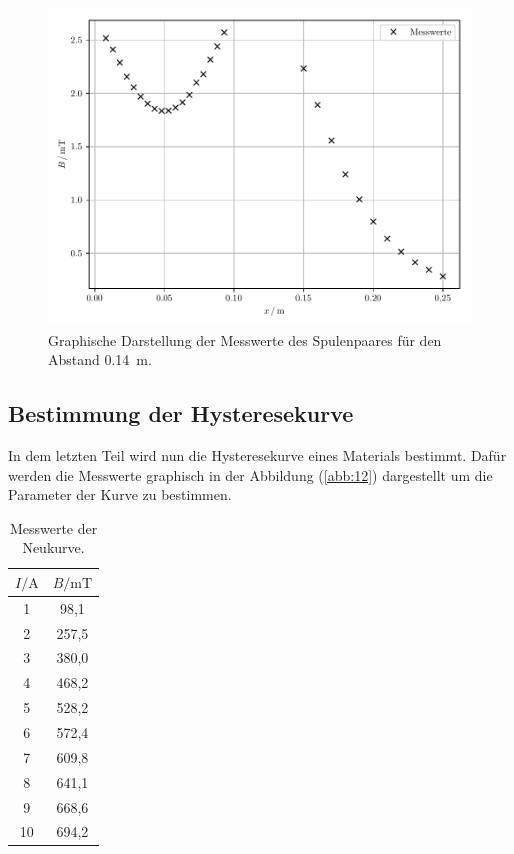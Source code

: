 \begin{figure}[H]
  \centering
  \includegraphics{plot5.pdf}
  \caption{Graphische Darstellung der Messwerte des Spulenpaares für den Abstand \SI{0.14}{\meter}.}
  \label{abb:11}
\end{figure}

\subsection{Bestimmung der Hysteresekurve}

In dem letzten Teil wird nun die Hysteresekurve eines Materials bestimmt. Dafür werden
die Messwerte graphisch in der Abbildung (\ref{abb:12}) dargestellt um die Parameter
der Kurve zu bestimmen.

\begin{table}
  \centering
  \caption{Messwerte der Neukurve.}
  \label{tab:6}
  \begin{tabular}{c c}
    \toprule
    $I/\si{\ampere}$ & $B/\si{\milli\tesla}$ \\
    \midrule
    1  &  98,1 \\
    2  & 257,5 \\
    3  & 380,0 \\
    4  & 468,2 \\
    5  & 528,2 \\
    6  & 572,4 \\
    7  & 609,8 \\
    8  & 641,1 \\
    9  & 668,6 \\
    10 & 694,2 \\
    \bottomrule
  \end{tabular}
\end{table}

